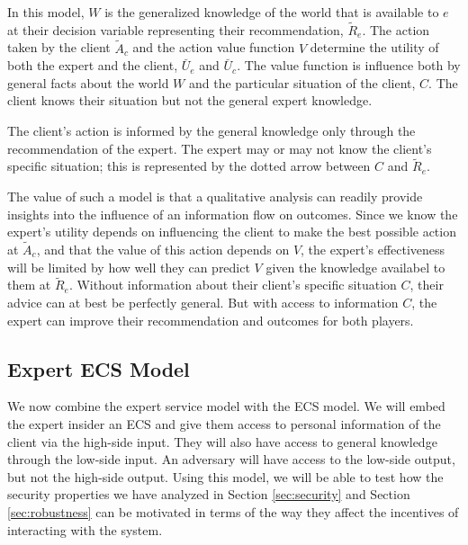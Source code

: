 \documentclass[../thesis.tex]{subfiles}
\begin{document}
In this model, $W$ is the generalized knowledge of the world that
is available to $e$ at their decision variable representing
their recommendation, $\tilde{R}_e$.
The action taken by the client $\tilde{A}_c$ and the
action value function $V$ determine the utility of
both the expert and the client, $\breve{U_e}$ and $\breve{U_c}$.
The value function is influence both by general facts about
the world $W$ and the particular situation of the client, $C$.
The client knows their situation but not the general expert knowledge.

The client's action is informed by the general knowledge only
through the recommendation of the expert.
The expert may or may not know the client's specific situation;
this is represented by the dotted arrow between $C$ and $\tilde{R}_e$.

The value of such a model is that a qualitative analysis
can readily provide insights into the influence of an
information flow on outcomes.
Since we know the expert's utility depends on influencing
the client to make the best possible action at $\tilde{A}_c$,
and that the value of this action depends on $V$,
the expert's effectiveness will be limited by how well
they can predict $V$ given the knowledge availabel to them
at $\tilde{R}_e$.
Without information about their client's specific situation $C$,
their advice can at best be perfectly general.
But with access to information $C$, the expert can improve
their recommendation and outcomes for both players.

\subsection{Expert ECS Model}
\label{sec:expert-ecs-model}

We now combine the expert service model with
the ECS model.
We will embed the expert insider an ECS and give them
access to personal information of the client via the
high-side input.
They will also have access to general knowledge
through the low-side input.
An adversary will have access to the low-side output,
but not the high-side output.
Using this model, we will be able to test how
the security properties we have analyzed in
Section \ref{sec:security}
and Section \ref{sec:robustness} can
be motivated in terms of the way they
affect the incentives of interacting with the
system.
\end{document}
